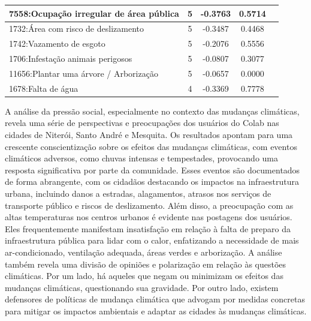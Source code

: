 \begin{table}[htbp]
\begin{tabular}{|l|c|c|c|c|}
		\hline
		7558:Ocupação irregular de área pública         & 5                & -0.3763        & 0.5714           \\
		\hline
		1732:Área com risco de deslizamento             & 5                & -0.3487        & 0.4468           \\
		\hline
		1742:Vazamento de esgoto                        & 5                & -0.2076        & 0.5556           \\
		\hline
		1706:Infestação animais perigosos               & 5                & -0.0807        & 0.3077           \\
		\hline
		11656:Plantar uma árvore / Arborização          & 5                & -0.0657        & 0.0000           \\
		\hline
		1678:Falta de água                              & 4                & -0.3369        & 0.7778           \\
		\hline
	\end{tabular}
\end{table}

A análise da pressão social, especialmente no contexto das mudanças climáticas, revela uma série de perspectivas e preocupações dos usuários do Colab nas cidades de Niterói, Santo André e Mesquita. Os resultados apontam para uma crescente conscientização sobre os efeitos das mudanças climáticas, com eventos climáticos adversos, como chuvas intensas e tempestades, provocando uma resposta significativa por parte da comunidade. Esses eventos são documentados de forma abrangente, com os cidadãos destacando os impactos na infraestrutura urbana, incluindo danos a estradas, alagamentos, atrasos nos serviços de transporte público e riscos de deslizamento. Além disso, a preocupação com as altas temperaturas nos centros urbanos é evidente nas postagens dos usuários. Eles frequentemente manifestam insatisfação em relação à falta de preparo da infraestrutura pública para lidar com o calor, enfatizando a necessidade de mais ar-condicionado, ventilação adequada, áreas verdes e arborização. A análise também revela uma divisão de opiniões e polarização em relação às questões climáticas. Por um lado, há aqueles que negam ou minimizam os efeitos das mudanças climáticas, questionando sua gravidade. Por outro lado, existem defensores de políticas de mudança climática que advogam por medidas concretas para mitigar os impactos ambientais e adaptar as cidades às mudanças climáticas.


